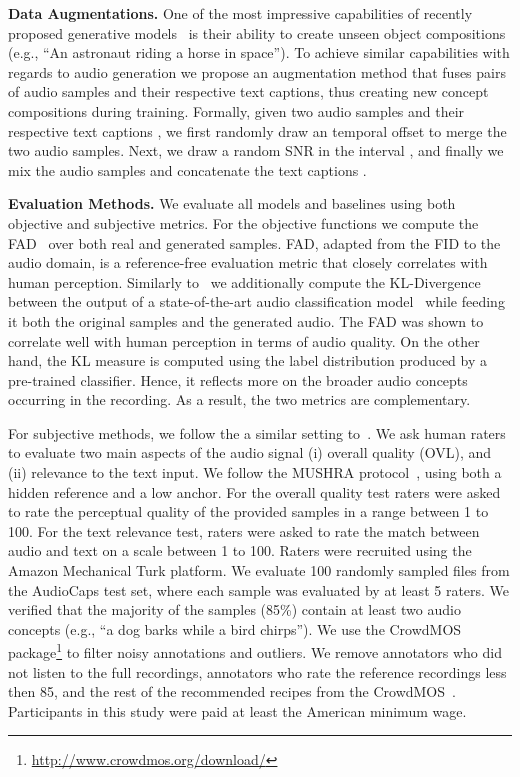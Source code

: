 {\noindent \bf{Data Augmentations.}} One of the most impressive capabilities of recently proposed generative models~\citep{ramesh2022hierarchical, imagen, gafni2022make} is their ability to create unseen object compositions (e.g., ``An astronaut riding a horse in space''). To achieve similar capabilities with regards to audio generation we propose an augmentation method that fuses pairs of audio samples and their respective text captions, thus creating new concept compositions during training. Formally, given two audio samples  and their respective text captions , we first randomly draw an temporal offset to merge the two audio samples. Next, we draw a random \ac{SNR} in the interval , and finally we mix the audio samples and concatenate the text captions .

{\noindent \bf{Evaluation Methods.}}
We evaluate all models and baselines using both objective and subjective metrics. For the objective functions we compute the \ac{FAD}~\citep{Kilgour2019FrchetAD} over both real and generated samples. \ac{FAD}, adapted from the \ac{FID} to the audio domain, is a reference-free evaluation metric that closely correlates with human perception. Similarly to~\citet{yang2022diffsound} we additionally compute the KL-Divergence between the output of a state-of-the-art audio classification model~\citep{koutini2021efficient} while feeding it both the original samples and the generated audio.
The FAD was shown to correlate well with human perception in terms of audio quality. On the other hand, the KL measure is computed using the label distribution produced by a pre-trained classifier. Hence, it reflects more on the broader audio concepts occurring in the recording. As a result, the two metrics are complementary. 

For subjective methods, we follow the a similar setting to~\citep{yang2022diffsound}. We ask human raters to evaluate two main aspects of the audio signal (i) overall quality (OVL), and (ii) relevance to the text input. We follow the MUSHRA protocol~\citep{series2014method}, using both a hidden reference and a low anchor. For the overall quality test raters were asked to rate the perceptual quality of the provided samples in a range between 1 to 100. For the text relevance test, raters were asked to rate the match between audio and text on a scale between 1 to 100. Raters were recruited using the Amazon Mechanical Turk platform. We evaluate 100 randomly sampled files from the AudioCaps test set, where each sample was evaluated by at least 5 raters. We verified that the majority of the samples (85\%) contain at least two audio concepts (e.g., ``a dog barks while a bird chirps''). We use the CrowdMOS package\footnote{\url{http://www.crowdmos.org/download/}} to filter noisy annotations and outliers. We remove annotators who did not listen to the full recordings, annotators who rate the reference recordings less then 85, and the rest of the recommended recipes from the CrowdMOS~\citep{ribeiro2011crowdmos}. Participants in this study were paid at least the American minimum wage.

